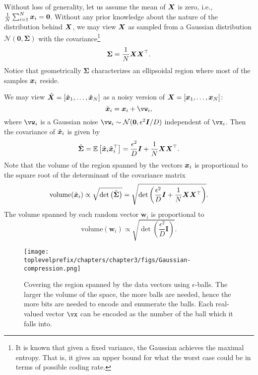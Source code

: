 \documentclass[../../book-main.tex]{subfiles}
\begin{document}
Without loss of generality, let us assume the mean of $\bm{X}$ is zero, i.e., $\frac{1}{N} \sum_{i = 1}^{N} \bm{x}_i = \boldsymbol{0}$. Without any prior knowledge about the nature of the distribution behind $\bm{X}$, we may view $\bm{X}$ as sampled from a Gaussian distribution $\mathcal{N}(\boldsymbol{0}, {\boldsymbol{\Sigma}})$ with the covariance\footnote{It is known that given a fixed variance, the Gaussian achieves the maximal entropy. That is, it gives an upper bound for what the worst case could be in terms of possible coding rate.}
\begin{equation}
	{\boldsymbol{\Sigma}} = \frac{1}{N} \bm{X}\bm{X}^\top.
\end{equation}
Notice that geometrically ${\boldsymbol{\Sigma}}$ characterizes an ellipsoidal region where most of the samples $\bm{x}_i$ reside.

We may view $\hat {\bm{X}} = [\hat {\bm{x}}_1,\ldots, \hat {\bm{x}}_N]$ as a noisy version of $\bm{X} = [\bm{x}_1, \ldots, \bm{x}_N]$:
\begin{equation}
	\hat \x_i = \x_i + \vw_i,
\end{equation}
where $\vw_i$ is a Gaussian noise $\vw_i  \sim \mathcal{N}(\boldsymbol{0} , {\epsilon^2}  \boldsymbol{I}/{D})$ independent of $\vx_i$. Then the covariance of $\hat {\bm{x}}_i$ is given by
\begin{equation}
	\hat{\boldsymbol{\Sigma}} = \mathbb{E}\left[\hat {\bm{x}}_i \hat {\bm{x}}_i^\top\right] = \frac{\epsilon^2}{D} \boldsymbol{I} + \frac{1}{N} \bm{X}\bm{X}^\top.
\end{equation}
Note that the volume of the region spanned by the vectors $\bm{x}_i$ is proportional to the square root of the determinant of the
covariance matrix
\begin{equation}
	\mbox{volume}(\hat {\bm{x}}_i) \propto \sqrt{\det \big(\hat{\boldsymbol{\Sigma}}\big)} = \sqrt{\det\left(\frac{\epsilon^2}{D} \boldsymbol{I} + \frac{1}{N} \bm{X}\bm{X}^\top \right)}.
\end{equation}
The volume spanned by each random vector $\boldsymbol{w}_i$ is
proportional to
\begin{equation}
	\mbox{volume}(\boldsymbol{w}_i) \propto   \sqrt{\det\left(\frac{\epsilon^2}{D} \boldsymbol{I} \right)}.
\end{equation}

\begin{figure}
	\centering
	\texttt{[image: \\toplevelprefix/chapters/chapter3/figs/Gaussian-compression.png]}
	\caption{Covering the region spanned by the data vectors using $\epsilon$-balls. The larger the volume of the space, the more balls are needed, hence the more bits are needed to encode and enumerate the balls. Each real-valued vector $\vx$ can be encoded as the number of the ball which it falls into.}
	\label{fig:ball-packing}
\end{figure}
\end{document}
